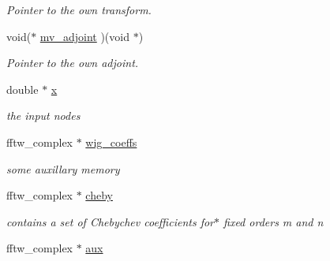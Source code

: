 \begin{CompactItemize}
\begin{CompactList}\small\item\em Pointer to the own transform. \item\end{CompactList}\item 
\hypertarget{structnfsoft__plan_bd4b85ee2e34f26391587b9527208cdd}{
void($\ast$ \hyperlink{structnfsoft__plan_bd4b85ee2e34f26391587b9527208cdd}{mv\_\-adjoint} )(void $\ast$)}
\label{structnfsoft__plan_bd4b85ee2e34f26391587b9527208cdd}

\begin{CompactList}\small\item\em Pointer to the own adjoint. \item\end{CompactList}\item 
\hypertarget{structnfsoft__plan_568e2c79a7c0e447fe635fa4a7e793bf}{
double $\ast$ \hyperlink{structnfsoft__plan_568e2c79a7c0e447fe635fa4a7e793bf}{x}}
\label{structnfsoft__plan_568e2c79a7c0e447fe635fa4a7e793bf}

\begin{CompactList}\small\item\em the input nodes \item\end{CompactList}\item 
fftw\_\-complex $\ast$ \hyperlink{structnfsoft__plan_10aef5036be8e0cf822db94e3b254543}{wig\_\-coeffs}
\begin{CompactList}\small\item\em some auxillary memory \item\end{CompactList}\item 
\hypertarget{structnfsoft__plan_7139a61f18756d43f5aff62233447378}{
fftw\_\-complex $\ast$ \hyperlink{structnfsoft__plan_7139a61f18756d43f5aff62233447378}{cheby}}
\label{structnfsoft__plan_7139a61f18756d43f5aff62233447378}

\begin{CompactList}\small\item\em contains a set of Chebychev coefficients for$\ast$ fixed orders m and n \item\end{CompactList}\item 
\hypertarget{structnfsoft__plan_3fcaa11033cad53c02ece5475d46cdee}{
fftw\_\-complex $\ast$ \hyperlink{structnfsoft__plan_3fcaa11033cad53c02ece5475d46cdee}{aux}}
\label{structnfsoft__plan_3fcaa11033cad53c02ece5475d46cdee}


\end{CompactItemize}

